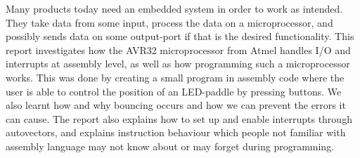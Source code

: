 Many products today need an embedded system in order to work as
intended. They take data from some input, process the data on a
microprocessor, and possibly sends data on some output-port if that is
the desired functionality. This report investigates how the AVR32
microprocessor from Atmel handles I/O and interrupts at assembly level,
as well as how programming such a microprocessor works. This was done by creating a small program in assembly code where the
user is able to control the position of an LED-paddle by pressing
buttons.  We also learnt how and why bouncing occurs and how we can prevent the errors it can cause. The report also explains how to set up and enable interrupts through
autovectors, and explains instruction behaviour which people not
familiar with assembly language may not know about or may forget during
programming.

\begin{comment}
TODO:
- rask konklusjon 
\end{comment}

